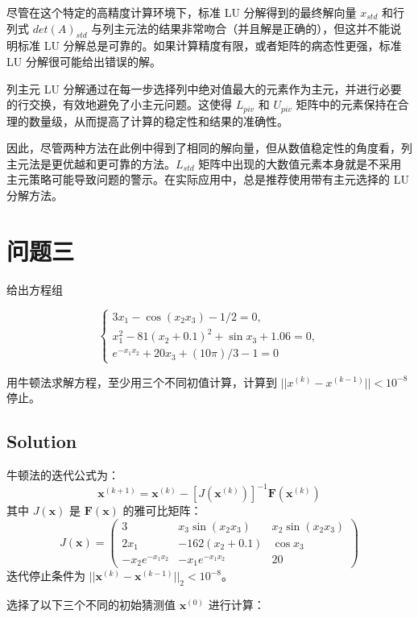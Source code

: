 \documentclass[11pt]{article}
\begin{document}
尽管在这个特定的高精度计算环境下，标准 LU 分解得到的最终解向量
\(x_{std}\) 和行列式 \(det(A)_{std}\)
与列主元法的结果非常吻合（并且解是正确的），但这并不能说明标准 LU
分解总是可靠的。如果计算精度有限，或者矩阵的病态性更强，标准 LU
分解很可能给出错误的解。

列主元 LU
分解通过在每一步选择列中绝对值最大的元素作为主元，并进行必要的行交换，有效地避免了小主元问题。这使得
\(L_{piv}\) 和 \(U_{piv}\)
矩阵中的元素保持在合理的数量级，从而提高了计算的稳定性和结果的准确性。

因此，尽管两种方法在此例中得到了相同的解向量，但从数值稳定性的角度看，列主元法是更优越和更可靠的方法。\(L_{std}\)
矩阵中出现的大数值元素本身就是不采用主元策略可能导致问题的警示。在实际应用中，总是推荐使用带有主元选择的
LU 分解方法。

    \section{问题三}\label{ux95eeux9898ux4e09}

给出方程组

\[
\begin{cases}
  3x_1 - \cos(x_2 x_3) - 1/2 = 0, \\
  x_1^2 - 81(x_2 + 0.1)^2 + \sin x_3 + 1.06 = 0,\\
  e^{-x_1 x_2} + 20x_3 + (10 \pi)/3 - 1 = 0
\end{cases}
\]

用牛顿法求解方程，至少用三个不同初值计算，计算到
\(||x^{(k)} - x^{(k-1)}||<10^{-8}\) 停止。

    \subsection{Solution}\label{solution}

牛顿法的迭代公式为：
\[ \mathbf{x}^{(k+1)} = \mathbf{x}^{(k)} - [J(\mathbf{x}^{(k)})]^{-1} \mathbf{F}(\mathbf{x}^{(k)}) \]
其中 \(J(\mathbf{x})\) 是 \(\mathbf{F}(\mathbf{x})\) 的雅可比矩阵： \[
J(\mathbf{x}) = \begin{pmatrix}
3 & x_3 \sin(x_2 x_3) & x_2 \sin(x_2 x_3) \\
2x_1 & -162(x_2 + 0.1) & \cos x_3 \\
-x_2 e^{-x_1 x_2} & -x_1 e^{-x_1 x_2} & 20
\end{pmatrix}
\] 迭代停止条件为
\(||\mathbf{x}^{(k)} - \mathbf{x}^{(k-1)}||_2 < 10^{-8}\)。

选择了以下三个不同的初始猜测值 \(\mathbf{x}^{(0)}\) 进行计算：
\end{document}
